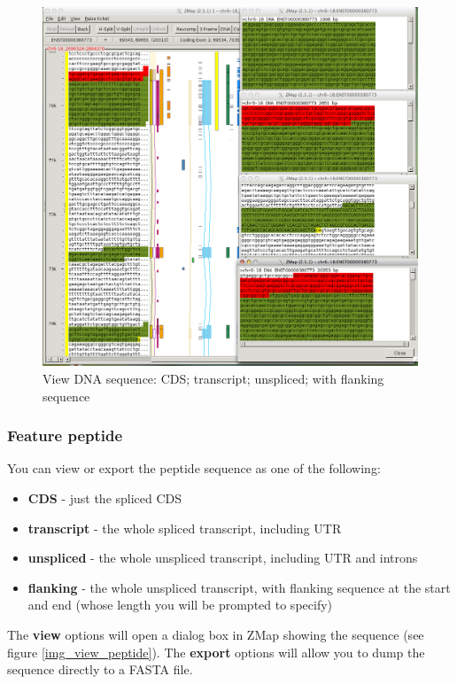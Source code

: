 \documentclass[letterpaper]{article}
\begin{document}
\begin{figure}
\centering
\color[rgb]{0.30980393,0.5058824,0.7411765}
\includegraphics[width=15.231cm]{img_view_dna.png}
\caption{View DNA sequence: CDS; transcript; unspliced; with flanking sequence}
\label{img_view_dna}
\end{figure}

\subsubsection{Feature peptide}
You can view or export the peptide sequence as one of the following:

\begin{itemize}
\item \textbf{CDS} - just the spliced CDS
\item \textbf{transcript} - the whole spliced transcript, including UTR
\item \textbf{unspliced} - the whole unspliced transcript, including UTR and introns
\item \textbf{flanking} - the whole unspliced transcript, with flanking sequence at the start and end (whose length you will be prompted to specify)
\end{itemize}

The \textbf{view} options will open a dialog box in ZMap showing the sequence (see figure \ref{img_view_peptide}). The \textbf{export} options will allow you to dump the sequence directly to a FASTA file.
\end{document}
